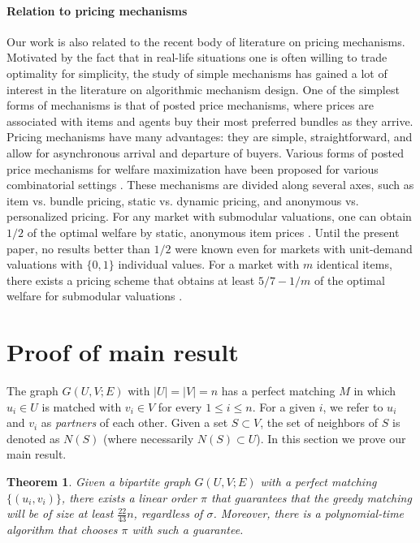 \documentclass[11pt]{article}
\numberwithin{equation}{section}
\newtheorem{theorem}{Theorem}[section]
\theoremstyle{definition}
\theoremstyle{plain}
\theoremstyle{plain}
\begin{document}
\paragraph*{Relation to pricing mechanisms}
Our work is also related to the recent body of literature on pricing mechanisms.
Motivated by the fact that in real-life situations one is often willing to trade optimality for simplicity, the study of simple mechanisms has gained a lot of interest in the literature on algorithmic mechanism design.
One of the simplest forms of mechanisms is that of posted price mechanisms, where prices are associated with items and agents buy their most preferred bundles as they arrive.
Pricing mechanisms have many advantages: they are simple, straightforward, and allow for asynchronous arrival and departure of buyers. %
Various forms of posted price mechanisms for welfare maximization have been proposed for various combinatorial settings \cite{FeldmanGL15,DuttingFKL16,Lucier17,EzraFRS20}. These mechanisms are divided along several axes, such as item vs. bundle pricing, static vs. dynamic pricing, and anonymous vs. personalized pricing.
For any market with submodular valuations, one can obtain $1/2$ of the optimal welfare by static, anonymous item prices \cite{FeldmanGL15}.
Until the present paper, no %
results better than  %
$1/2$ were known even for markets with unit-demand valuations with $\{0,1\}$ individual values.
For a market with $m$ identical items, there exists a pricing scheme that obtains at least $5/7-1/m$ of the optimal welfare for submodular valuations \cite{EzraFRS20}.






\section{Proof of main result}
\label{sec:main-result}

The graph $G(U,V;E)$ with $|U| = |V| = n$ has a perfect matching $M$ in which $u_i \in U$ is matched with $v_i \in V$ for every $1 \le i \le n$. For a given $i$, we refer to $u_i$ and $v_i$ as \emph{partners} of each other. Given a set $S \subset V$, the set of neighbors of $S$ is denoted  as $N(S)$ (where necessarily $N(S) \subset U$).
%
In this section we prove our main result.

\begin{theorem}
	\label{thm:86}
	Given a bipartite graph $G(U,V;E)$ with a perfect matching $\{(u_i,v_i)\}$, there exists a linear order $\pi$ that guarantees that the greedy matching will be of size at least $\frac{22}{43}n$, regardless of $\sigma$. Moreover, there is a polynomial-time algorithm that chooses $\pi$ with such a guarantee.
\end{theorem}
\end{document}
